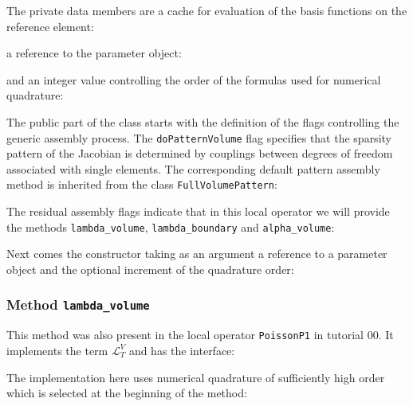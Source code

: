 \documentclass[a4paper,12pt]{article}
\begin{document}
The private data members are a cache for evaluation of the basis functions
on the reference element:

a reference to the parameter object:

and an integer value controlling the order of the formulas used for numerical quadrature:


The public part of the class starts with the definition of the flags controlling
the generic assembly process. The \lstinline{doPatternVolume} flag
specifies that the sparsity pattern of the Jacobian is determined by couplings
between degrees of freedom associated with single elements. The corresponding
default pattern assembly method is inherited from the class \lstinline{FullVolumePattern}:


The residual assembly flags indicate that in this local operator we will provide
the methods \lstinline{lambda_volume}, \lstinline{lambda_boundary}
and \lstinline{alpha_volume}:


Next comes the constructor taking as an argument a reference to a
parameter object and the optional increment of the quadrature order:


\subsubsection*{Method \lstinline{lambda_volume}}

This method was also present in the local operator \lstinline{PoissonP1}
in tutorial 00. It implements the term $\mathcal{L}_T^V$ and has the interface:


The implementation here uses numerical quadrature of sufficiently high order
which is selected at the beginning of the method:

\end{document}
